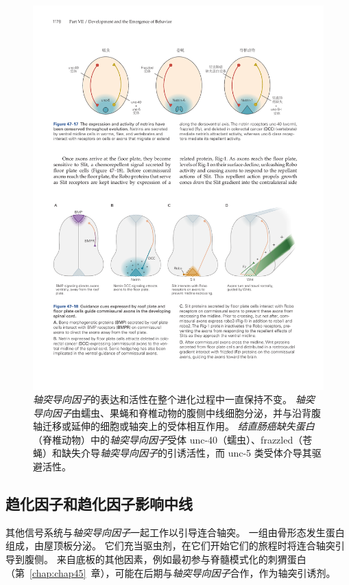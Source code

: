\begin{figure}[htbp]
	\centering
	\includegraphics[width=1.0\linewidth]{chap47/fig_47_17}
	\caption{\textit{轴突导向因子}的表达和活性在整个进化过程中一直保持不变。
		\textit{轴突导向因子}由蠕虫、果蝇和脊椎动物的腹侧中线细胞分泌，并与沿背腹轴迁移或延伸的细胞或轴突上的受体相互作用。
		\textit{结直肠癌缺失蛋白}（脊椎动物）中的\textit{轴突导向因子}受体 unc-40（蠕虫）、frazzled（苍蝇）和缺失介导\textit{轴突导向因子}的引诱活性，而 unc-5 类受体介导其驱避活性。}
	\label{fig:47_17}
\end{figure}



\subsection{趋化因子和趋化因子影响中线}

其他信号系统与\textit{轴突导向因子}一起工作以引导连合轴突。
一组由骨形态发生蛋白组成，由屋顶板分泌。
它们充当驱虫剂，在它们开始它们的旅程时将连合轴突引导到腹侧。
来自底板的其他因素，例如最初参与脊髓模式化的刺猬蛋白（第~\ref{chap:chap45}~章），可能在后期与\textit{轴突导向因子}合作，作为轴突引诱剂。


